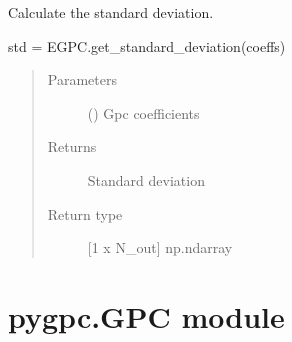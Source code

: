 \documentclass[letterpaper,10pt,english,openany,oneside]{sphinxmanual}
\begin{document}
\begin{fulllineitems}
\begin{fulllineitems}
\label{\detokenize{pygpc:pygpc.EGPC.EGPC.get_standard_deviation}}
Calculate the standard deviation.

std = EGPC.get\_standard\_deviation(coeffs)
\begin{quote}\begin{description}
\item[{Parameters}] \leavevmode
{} (\sphinxstyleliteralemphasis{\sphinxupquote{ {[}}}\sphinxstyleliteralemphasis{\sphinxupquote{{]}}}) \textendash{} Gpc coefficients

\item[{Returns}] \leavevmode
{} \textendash{} Standard deviation

\item[{Return type}] \leavevmode
{[}1 x N\_out{]} np.ndarray

\end{description}\end{quote}

\end{fulllineitems}


\end{fulllineitems}



\section{pygpc.GPC module}
\label{\detokenize{pygpc:module-pygpc.GPC}}\label{\detokenize{pygpc:pygpc-gpc-module}}
\end{document}
